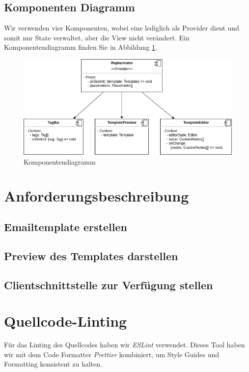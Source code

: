 \documentclass[a4paper, titlepage]{article}
\begin{document}
  \subsection{Komponenten Diagramm}
  Wir verwenden vier Komponenten, wobei eine lediglich
  als Provider dient und somit nur State verwaltet,
  aber die View nicht verändert. Ein Komponentendiagramm
  finden Sie in Abbildung \ref{component-diagram}.
  \begin{figure}
    \includegraphics[width=\textwidth]{images/react-replacinator.png}
    \caption{Komponentendiagramm}
    \label{component-diagram}
  \end{figure}
  \section{Anforderungsbeschreibung}
  \subsection{Emailtemplate erstellen}
  \subsection{Preview des Templates darstellen}
  \subsection{Clientschnittstelle zur Verfügung stellen}
  \subsection{}
  \section{Quellcode-Linting}
  Für das Linting des Quellcodes haben wir \emph{ESLint} verwendet.
  Dieses Tool haben wir mit dem Code Formatter \emph{Prettier}
  kombiniert, um Style Guides und Formatting konsistent
  zu halten.
\end{document}
